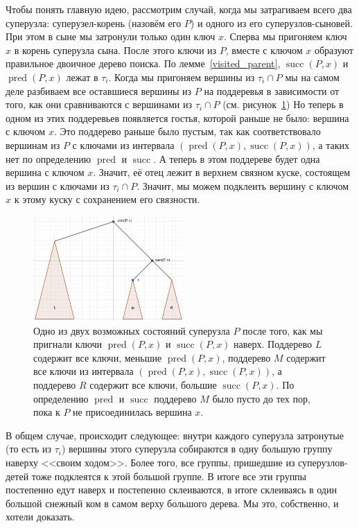 Чтобы понять главную идею, рассмотрим случай, когда мы затрагиваем всего два суперузла: суперузел-корень (назовём его $P$) и одного из его суперузлов-сыновей. При этом в сыне мы затронули только один ключ $x$. Сперва мы пригоняем ключ $x$ в корень суперузла сына.
После этого ключи из $P$, вместе с ключом $x$ образуют правильное двоичное дерево поиска.
По лемме~\ref{visited_parent}, $\operatorname{succ}(P, x)$ и $\operatorname{pred}(P, x)$ лежат в $\tau_i$. Когда мы пригоняем вершины из $\tau_i \cap P$ мы на самом деле разбиваем все оставшиеся вершины из $P$ на поддеревья в зависимости от того, как они сравниваются с вершинами из $\tau_i \cap P$ (см. рисунок~\ref{tree_separation}) Но теперь в одном из этих поддеревьев появляется гостья, которой раньше не было: вершина с ключом $x$. Это поддерево раньше было пустым, так как соответствовало вершинам из $P$ с ключами из интервала $(\operatorname{pred}(P, x), \operatorname{succ}(P, x))$, а таких нет по определению $\operatorname{pred}$ и $\operatorname{succ}$. А теперь в этом поддереве будет одна вершина с ключом $x$. Значит, её отец лежит в верхнем связном куске, состоящем из вершин с ключами из $\tau_i \cap P$. Значит, мы можем подклеить вершину с ключом $x$ к этому куску с сохранением его связности.

	\begin{figure} \centering
		\includegraphics[height=4cm]{img/final_state_of_parent.png}

		\caption{Одно из двух возможных состояний суперузла $P$ после того, как мы пригнали ключи
		$\operatorname{pred}(P, x)$ и $\operatorname{succ}(P, x)$ наверх. Поддерево $L$
		содержит все ключи, меньшие $\operatorname{pred}(P, x)$, поддерево $M$ содержит
		все ключи из интервала $(\operatorname{pred}(P, x), \operatorname{succ}(P, x))$,
		а поддерево $R$ содержит все ключи, большие $\operatorname{succ}(P, x)$. 
		По определению $\operatorname{pred}$ и $\operatorname{succ}$ поддерево $M$ было пусто до тех пор, пока к $P$ не присоединилась вершина $x$.}
		\label{tree_separation}
	\end{figure}

В общем случае, происходит следующее: внутри каждого суперузла затронутые (то есть из $\tau_i$) вершины этого суперузла собираются в одну большую группу наверху <<своим ходом>>. Более того, все группы, пришедшие из суперузлов-детей тоже подклеятся к этой большой группе. В итоге все эти группы постепенно едут наверх и постепенно склеиваются, в итоге склеиваясь в один большой снежный ком в самом верху большого дерева. Мы это, собственно, и хотели доказать.

